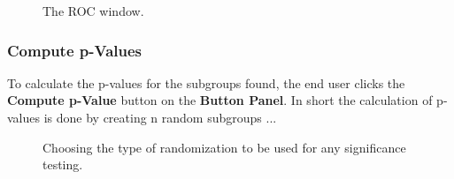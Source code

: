 \documentclass{article}
\begin{document}
\begin{figure}
\begin{center}
\centering
{}
\caption{The ROC window.}
\end{center}
\label{fig:rocwindow}
\end{figure}



\subsubsection{Compute p-Values}
\label{result-window:p}
To calculate the p-values for the subgroups found, the end user clicks the \textbf{Compute p-Value} button on the \textbf{Button Panel}.
In short the calculation of p-values is done by creating n random subgroups ...

\begin{figure}
\begin{center}
\centering
{}
\caption{Choosing the type of randomization to be used for any significance testing.}
\end{center}
\label{fig:randomizationdialog}
\end{figure}
\end{document}
